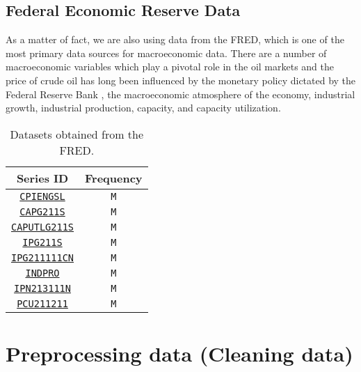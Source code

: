 \subsection{Federal Economic Reserve Data}

As a matter of fact, we are also using data from the FRED, which is one of the most primary data sources for macroeconomic data. There are a number of macroeconomic variables which play a pivotal role in the oil markets and the price of crude oil has long been influenced by the monetary policy dictated by the Federal Reserve Bank \cite{hamilton2004oil}, the macroeconomic atmosphere \cite{ferderer1996oil} of the economy,  industrial growth, industrial production, capacity, and capacity utilization.

\begin{table}
\begin{center}
\begin{tabular}{|c|c|}
\hline
\textbf{Series ID} & \textbf{Frequency} \\ \hline
\href{https://fred.stlouisfed.org/series/CPIENGSL}{\texttt{CPIENGSL}} & \texttt{M} \\  \hline
\href{https://fred.stlouisfed.org/series/CAPG211S}{\texttt{CAPG211S}} & \texttt{M} \\  \hline
\href{https://fred.stlouisfed.org/series/CAPUTLG211S}{\texttt{CAPUTLG211S}} & \texttt{M} \\  \hline
\href{https://fred.stlouisfed.org/series/IPG211S}{\texttt{IPG211S}} & \texttt{M} \\  \hline
\href{https://fred.stlouisfed.org/series/IPG211111CN}{\texttt{IPG211111CN}} & \texttt{M}  \\  \hline
\href{https://fred.stlouisfed.org/series/INDPRO}{\texttt{INDPRO}} & \texttt{M} \\  \hline
\href{https://fred.stlouisfed.org/series/IPN213111N}{\texttt{IPN213111N}} & \texttt{M} \\  \hline
\href{https://fred.stlouisfed.org/series/PCU211211}{\texttt{PCU211211}} & \texttt{M} \\  \hline
\end{tabular}
\end{center}
\caption{Datasets obtained from the FRED.}
\end{table}
\section{Preprocessing data (Cleaning data)}


